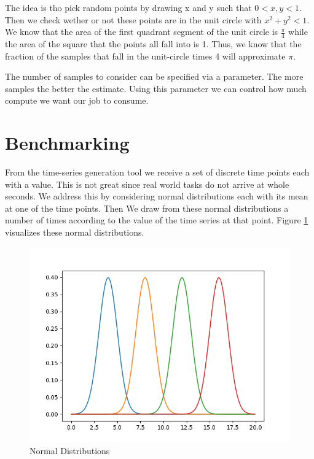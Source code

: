 The idea is tho pick random points by drawing x and y such that $0 < x, y < 1$. Then we check wether or not these points are in the unit circle with $x^2 + y^2 < 1$. We know that the area of the first quadrant segment of the unit circle is $\frac{\pi}{4}$ while the area of the square that the points all fall into is 1. Thus, we know that the fraction of the samples that fall in the unit-circle times 4 will approximate $\pi$.

The number of samples to consider can be specified via a parameter. The more samples the better the estimate. Using this parameter we can control how much compute we want our job to consume. 

\section{Benchmarking}

From the time-series generation tool we receive a set of discrete time points each with a value. This is not great since real world tasks do not arrive at whole seconds. We address this by considering normal distributions each with its mean at one of the time points. Then We draw from these normal distributions a number of times according to the value of the time series at that point. Figure \ref{fig:normal-dists} visualizes these normal distributions.

\begin{figure}
   \centering
   \includegraphics[scale=0.70]{figures/normal-dists.png}
\caption{Normal Distributions}    
\label{fig:normal-dists}
\end{figure}

